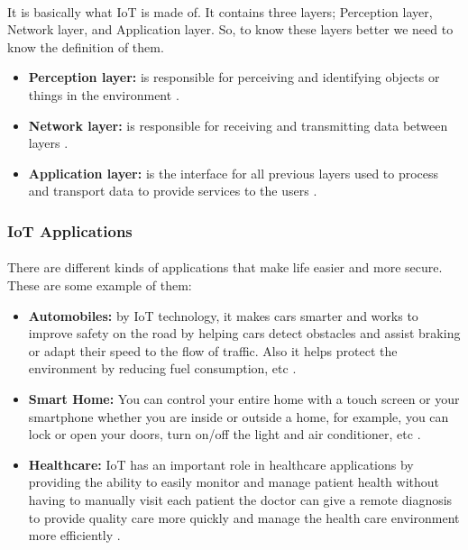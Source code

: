 \documentclass[12pt, oneside, a4paper]{book}
\newcommand\boldcolor[1]{\textcolor{bold}{\textbf{#1}}}
\begin{document}
			\paragraph{} It is basically what IoT is made of. It contains three layers; Perception layer, Network layer, and Application layer. So, to know these layers better we need to know the definition of them.
			\begin{itemize}
				\item \boldcolor{Perception layer:} is responsible for perceiving and identifying objects or things in the environment \cite{iot_4}.
				\item \boldcolor{Network layer:} is responsible for receiving and transmitting data between layers \cite{iot_5}.
				\item \boldcolor{Application layer:} is the interface for all previous layers used to process and transport data to provide services to the users \cite{iot_6}.
			\end{itemize}
			\subsubsection{IoT Applications}
			\paragraph{}There are different kinds of applications that make life easier and more secure. These are some example of them:
			\begin{itemize}
			\item \boldcolor{Automobiles:}  by IoT technology, it makes cars smarter and works to improve safety on the road by helping cars detect obstacles and assist braking or adapt their speed to the flow of traffic. Also it helps protect the environment by reducing fuel consumption, etc \cite{iot_7}.
			\item \boldcolor{Smart Home:}  You can control your entire home with a touch screen or your smartphone whether you are inside or outside a home, for example, you can lock or open your doors, turn on/off the light and air conditioner, etc \cite{iot_8}.
			\item \boldcolor{Healthcare:} IoT has an important role in healthcare applications by providing the ability to easily monitor and manage patient health without having to manually visit each patient the doctor can give a remote diagnosis to provide quality care more quickly and manage the health care environment more efficiently \cite{iot_5}.
			\end{itemize}
\end{document}
